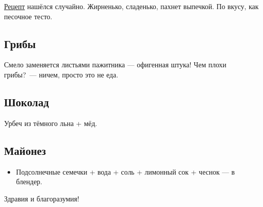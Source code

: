 \hyperref[cookies]{Рецепт} нашёлся случайно. Жирненько, сладенько, пахнет выпечкой. По вкусу, как песочное тесто.

\subsection{Грибы}

Смело заменяется листьями пажитника — офигенная штука! Чем плохи грибы?~--- ничем, просто это не еда.

\subsection{Шоколад}

Урбеч из тёмного льна + мёд.

\subsection{Майонез}
\begin{itemize}
\item Подсолнечные семечки + вода + соль + лимонный сок + чеснок — в блендер.
\end{itemize}

Здравия и благоразумия!

